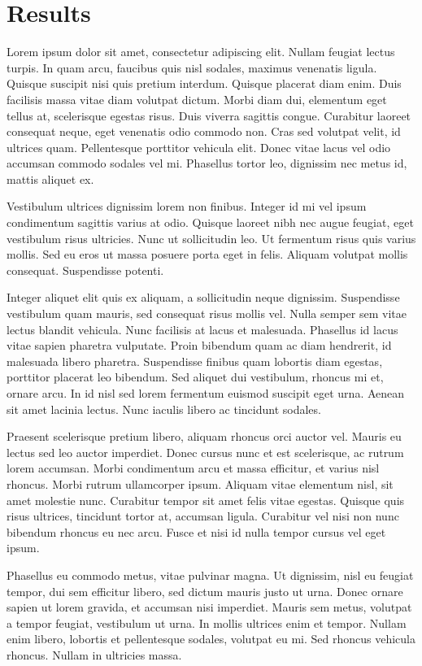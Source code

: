 \chapter{Results}
\label{chap:results}

Lorem ipsum dolor sit amet, consectetur adipiscing elit. Nullam feugiat lectus turpis. In quam arcu, faucibus quis nisl sodales, maximus venenatis ligula. Quisque suscipit nisi quis pretium interdum. Quisque placerat diam enim. Duis facilisis massa vitae diam volutpat dictum. Morbi diam dui, elementum eget tellus at, scelerisque egestas risus. Duis viverra sagittis congue. Curabitur laoreet consequat neque, eget venenatis odio commodo non. Cras sed volutpat velit, id ultrices quam. Pellentesque porttitor vehicula elit. Donec vitae lacus vel odio accumsan commodo sodales vel mi. Phasellus tortor leo, dignissim nec metus id, mattis aliquet ex.

Vestibulum ultrices dignissim lorem non finibus. Integer id mi vel ipsum condimentum sagittis varius at odio. Quisque laoreet nibh nec augue feugiat, eget vestibulum risus ultricies. Nunc ut sollicitudin leo. Ut fermentum risus quis varius mollis. Sed eu eros ut massa posuere porta eget in felis. Aliquam volutpat mollis consequat. Suspendisse potenti.

Integer aliquet elit quis ex aliquam, a sollicitudin neque dignissim. Suspendisse vestibulum quam mauris, sed consequat risus mollis vel. Nulla semper sem vitae lectus blandit vehicula. Nunc facilisis at lacus et malesuada. Phasellus id lacus vitae sapien pharetra vulputate. Proin bibendum quam ac diam hendrerit, id malesuada libero pharetra. Suspendisse finibus quam lobortis diam egestas, porttitor placerat leo bibendum. Sed aliquet dui vestibulum, rhoncus mi et, ornare arcu. In id nisl sed lorem fermentum euismod suscipit eget urna. Aenean sit amet lacinia lectus. Nunc iaculis libero ac tincidunt sodales.

Praesent scelerisque pretium libero, aliquam rhoncus orci auctor vel. Mauris eu lectus sed leo auctor imperdiet. Donec cursus nunc et est scelerisque, ac rutrum lorem accumsan. Morbi condimentum arcu et massa efficitur, et varius nisl rhoncus. Morbi rutrum ullamcorper ipsum. Aliquam vitae elementum nisl, sit amet molestie nunc. Curabitur tempor sit amet felis vitae egestas. Quisque quis risus ultrices, tincidunt tortor at, accumsan ligula. Curabitur vel nisi non nunc bibendum rhoncus eu nec arcu. Fusce et nisi id nulla tempor cursus vel eget ipsum.

Phasellus eu commodo metus, vitae pulvinar magna. Ut dignissim, nisl eu feugiat tempor, dui sem efficitur libero, sed dictum mauris justo ut urna. Donec ornare sapien ut lorem gravida, et accumsan nisi imperdiet. Mauris sem metus, volutpat a tempor feugiat, vestibulum ut urna. In mollis ultrices enim et tempor. Nullam enim libero, lobortis et pellentesque sodales, volutpat eu mi. Sed rhoncus vehicula rhoncus. Nullam in ultricies massa.

